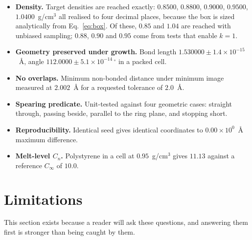 \documentclass[11pt,a4paper]{article}
\begin{document}
\begin{itemize}
\item \textbf{Density.} Target densities are reached exactly: $0.8500$,
      $0.8800$, $0.9000$, $0.9500$, $1.0400$~g/cm$^3$ all realised to four
      decimal places, because the box is sized analytically from
      Eq.~\eqref{eq:box}. Of these, $0.85$ and $1.04$ are reached with
      unbiased sampling; $0.88$, $0.90$ and $0.95$ come from tests that
      enable $k=1$.
\item \textbf{Geometry preserved under growth.} Bond length
      $1.530000 \pm 1.4\times10^{-15}$~\AA, angle
      $112.0000 \pm 5.1\times10^{-14}\,^\circ$ in a packed cell.
\item \textbf{No overlaps.} Minimum non-bonded distance under minimum image
      measured at $2.002$~\AA{} for a requested tolerance of $2.0$~\AA.
\item \textbf{Spearing predicate.} Unit-tested against four geometric cases:
      straight through, passing beside, parallel to the ring plane, and
      stopping short.
\item \textbf{Reproducibility.} Identical seed gives identical coordinates to
      $0.00\times10^{0}$~\AA{} maximum difference.
\item \textbf{Melt-level $C_n$.} Polystyrene in a cell at $0.95$~g/cm$^3$
      gives $11.13$ against a reference $C_\infty$ of $10.0$.
\end{itemize}

\section{Limitations}
\label{sec:limitations}

This section exists because a reader will ask these questions, and answering
them first is stronger than being caught by them.
\end{document}
